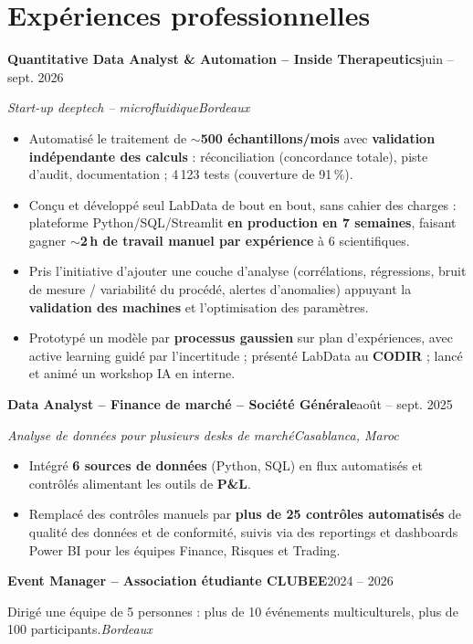 \documentclass[a4paper,11pt]{article}
\newcommand{\entry}[4]{%
  \textbf{#1}\hfill #2\par
  \textit{#3}\hfill\textit{#4}\par}
\newcommand{\entryline}[4]{%
  \textbf{#1}\hfill #2\par
  #3\hfill\textit{#4}\par}
\newcommand{\entrygap}{\par\vspace{3pt}}
\newenvironment{bullets}
  {\begin{itemize}[nosep, leftmargin=1em, itemsep=1pt, label=--]}
  {\end{itemize}}
\begin{document}
\section{Expériences professionnelles}
\entry{Quantitative Data Analyst \& Automation – Inside Therapeutics}{juin – sept. 2026}
      {Start-up deeptech – microfluidique}{Bordeaux}
\begin{bullets}
\item Automatisé le traitement de \textbf{$\sim$500 échantillons/mois} avec \textbf{validation indépendante des calculs} : \mbox{réconciliation} (concordance totale), piste d'audit, documentation ; 4\,123 tests (couverture de 91\,\%).
\item Conçu et développé seul LabData de bout en bout, sans cahier des charges : plateforme Python/\allowbreak SQL/\allowbreak Streamlit \textbf{en production en 7 semaines}, faisant gagner \textbf{$\sim$2\,h de travail manuel par expérience} à 6 scientifiques.
\item Pris l'initiative d'ajouter une couche d'analyse (corrélations, régressions, bruit de mesure / variabilité du procédé, alertes d'anomalies) appuyant la \textbf{validation des machines} et l'optimisation des paramètres.
\item Prototypé un modèle par \textbf{processus gaussien} sur plan d'expériences, avec active learning guidé par l'incertitude ; présenté LabData au \textbf{CODIR} ; lancé et animé un workshop IA en interne.
\end{bullets}
\entrygap
\entry{Data Analyst – Finance de marché – Société Générale}{août – sept. 2025}
      {Analyse de données pour plusieurs desks de marché}{Casablanca, Maroc}
\begin{bullets}
\item Intégré \textbf{6 sources de données} (Python, SQL) en flux automatisés et contrôlés alimentant les outils de \textbf{P\&L}.
\item Remplacé des contrôles manuels par \textbf{plus de 25 contrôles automatisés} de qualité des données et de conformité, suivis via des reportings et dashboards Power BI pour les équipes Finance, Risques et Trading.
\end{bullets}
\entrygap
\entryline{Event Manager – Association étudiante CLUBEE}{2024 – 2026}
          {Dirigé une équipe de 5 personnes : plus de 10 événements multiculturels, plus de 100 participants.}{Bordeaux}
\end{document}
